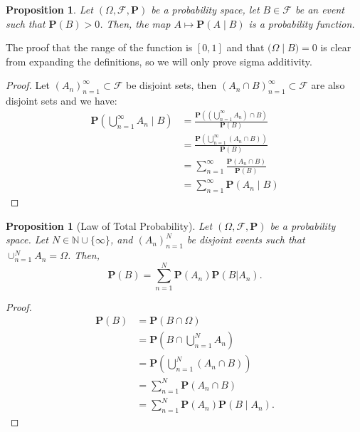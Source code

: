 \documentclass[11pt,a4paper]{article}
\theoremstyle{definition}
\theoremstyle{plain}
\newtheorem{proposition}[theorem]{Proposition}
\newcommand{\N}{\mathbb{N}}
\newcommand{\Prob}{\mathbf{P}}
\begin{document}
  \begin{proposition}
    Let $(\Omega, \mathcal F, \Prob)$ be a probability space, let 
    $B \in \mathcal F$ be an event such that $\Prob(B) > 0$. Then,
    the map $A \mapsto \Prob(A \mid B)$ is a probability function.
  \end{proposition}
  The proof that the range of the function is $[0,1]$ and that 
  $\mathbf (\Omega \mid B) = 0$ is clear from expanding the definitions,
  so we will only prove sigma additivity.
  \begin{proof}
    Let $(A_n)_{n=1}^{\infty} \subset \mathcal F$ be disjoint sets, then
    $(A_n \cap B)_{n=1}^{\infty} \subset \mathcal F$ are also disjoint sets
    and we have:
      \begin{align*}
        \Prob\left( \bigcup_{n=1}^{\infty} A_n \mid B \right) 
        & = \frac{\Prob\left( \left( \bigcup_{n=1}^{\infty} A_n \right) \cap B \right)}{\Prob(B)} \\
        & = \frac{\Prob\left( \bigcup_{n=1}^{\infty} (A_n \cap B) \right)}{\Prob(B)} \\
        & = \sum_{n=1}^{\infty} \frac{\Prob(A_n \cap B)}{\Prob(B)} \\
        & = \sum_{n=1}^{\infty} \Prob(A_n \mid B)
      \end{align*}
  \end{proof}

  \begin{proposition}[Law of Total Probability]
    Let $(\Omega, \mathcal F, \Prob)$ be a probability space.
    Let $N \in \N \cup \{\infty\}$, and $(A_n)_{n=1}^{N}$ be disjoint events
    such that $\cup_{n=1}^{N} A_n = \Omega$. Then,
    \[
      \Prob(B)=\sum_{n=1}^{N}\Prob(A_{n})\Prob(B|A_{n}).
    \]
  \end{proposition}
  \begin{proof}
    \begin{align*}
      \Prob(B) &= 
      \Prob(B \cap \Omega) \\ &= 
      \Prob\left( B \cap \bigcup_{n=1}^{N} A_n \right) \\ &= 
      \Prob\left( \bigcup_{n=1}^{N} (A_n \cap B) \right) \\ &= 
      \sum_{n=1}^{N} \Prob(A_n \cap B) \\ &= 
      \sum_{n=1}^{N} \Prob(A_n) \Prob(B \mid A_n).
      \end{align*}
  \end{proof}
\end{document}
